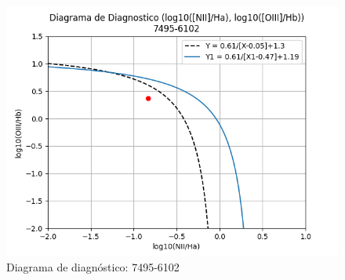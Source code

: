 \documentclass[10pt,twocolumn,a4paper]{opticajnl}
\begin{document}
\begin{figure}
  \begin{center}
    \includegraphics[width=1\linewidth]{../Codigos/diagramasDeDiagnostico/diagramadiag_7495-6102.png}
  \end{center}
  \caption{Diagrama de diagnóstico: 7495-6102}
  \label{fig:diagramadiag_7495-6102}
\end{figure}
\end{document}

